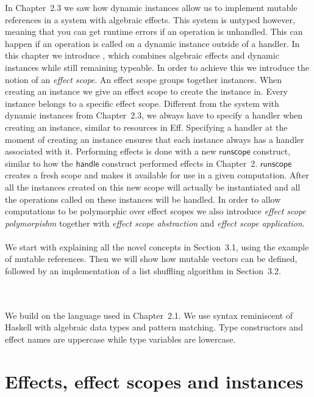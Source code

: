 In Chapter~2.3 we saw how dynamic instances allow us to implement mutable references in a system with algebraic effects.
This system is untyped however, meaning that you can get runtime errors if an operation is unhandled.
This can happen if an operation is called on a dynamic instance outside of a handler.
In this chapter we introduce \lang{}, which combines algebraic effects and dynamic instances while still remaining typeable.
In order to achieve this we introduce the notion of an \emph{effect scope}.
An effect scope groups together instances.
When creating an instance we give an effect scope to create the instance in.
Every instance belongs to a specific effect scope.
Different from the system with dynamic instances from Chapter~2.3, we always have to specify a handler when creating an instance, similar to resources in Eff.
Specifying a handler at the moment of creating an instance ensures that each instance always has a handler associated with it.
Performing effects is done with a new $\mathsf{runscope}$ construct, similar to how the $\mathsf{handle}$ construct performed effects in Chapter~2.
$\mathsf{runscope}$ creates a fresh scope and makes it available for use in a given computation.
After all the instances created on this new scope will actually be instantiated and all the operations called on these instances will be handled.
In order to allow computations to be polymorphic over effect scopes we also introduce \emph{effect scope polymorpishm} together with \emph{effect scope abstraction} and \emph{effect scope application}.
\\\\
We start with explaining all the novel concepts in Section~3.1, using the example of mutable references.
Then we will show how mutable vectors can be defined, followed by an implementation of a list shuffling algorithm in Section~3.2.
\iffalse
We end the chapter by showing how our system allows for local effects in Section~3.3.
\fi
\\\\
We build on the language used in Chapter~2.1.
We use syntax reminiscent of Haskell with algebraic data types and pattern matching.
Type constructors and effect names are uppercase while type variables are lowercase.

\section{Effects, effect scopes and instances}
\label{section:basics}

